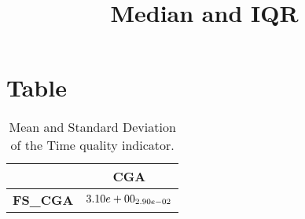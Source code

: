 \documentclass{article}
\title{Median and IQR}
\author{}
\begin{document}
\maketitle
\section{Table}
\begin{table}[!htp]
  \caption{Mean and Standard Deviation of the Time quality indicator.}
  \label{table:Time}
  \centering
  \begin{scriptsize}
  \begin{tabular}{c|c}
      & \textbf{CGA} \\\hline
      \textbf{FS_CGA} & $\cellcolor{gray95} \cellcolor{gray25} 3.10e+00_{2.90e-02}$ \\
  \end{tabular}
  \end{scriptsize}
\end{table}
\end{document}
